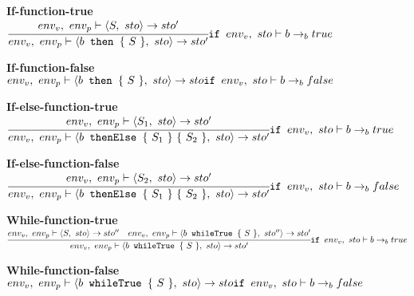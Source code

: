 \textbf{If-function-true}\\
\begin{math}
	\cfrac
		{env_v,\ env_p \vdash \langle S,\ sto \rangle \rightarrow sto'}
		{env_v,\ env_p \vdash \langle b \texttt{ then } \{\ S\ \},\ sto \rangle \rightarrow sto'}\\
	\texttt{if } env_v,\ sto \vdash b \rightarrow_b true
\end{math}

\textbf{If-function-false}\\
\begin{math}
	env_v,\ env_p \vdash \langle b \texttt{ then } \{\ S\ \},\ sto \rangle \rightarrow sto\\
	\texttt{if } env_v,\ sto \vdash b \rightarrow_b false
\end{math}

\textbf{If-else-function-true}\\
\begin{math}
	\cfrac
		{env_v,\ env_p \vdash \langle S_1,\ sto \rangle \rightarrow sto'}
		{env_v,\ env_p \vdash \langle b \texttt{ thenElse } \{\ S_1\ \}\ \{\ S_2\ \},\ sto \rangle \rightarrow sto'}\\
	\texttt{if } env_v,\ sto \vdash b \rightarrow_b true
\end{math}

\textbf{If-else-function-false}\\
\begin{math}
	\cfrac
		{env_v,\ env_p \vdash \langle S_2,\ sto \rangle \rightarrow sto'}
		{env_v,\ env_p \vdash \langle b \texttt{ thenElse } \{\ S_1\ \}\ \{\ S_2\ \},\ sto \rangle \rightarrow sto'}\\
	\texttt{if } env_v,\ sto \vdash b \rightarrow_b false
\end{math}

\textbf{While-function-true}\\
\begin{math}
	\cfrac
		{env_v,\ env_p \vdash \langle S,\ sto \rangle \rightarrow sto'' \quad env_v,\ env_p \vdash \langle  b \texttt{ whileTrue } \{\ S\ \} ,\ sto'' \rangle \rightarrow sto'}
		{env_v,\ env_p \vdash \langle b \texttt{ whileTrue } \{\ S\ \} ,\ sto \rangle \rightarrow sto'}\\
	\texttt{if } env_v,\ sto \vdash b \rightarrow_b true
\end{math}

\textbf{While-function-false}\\
\begin{math}
	env_v,\ env_p \vdash \langle b \texttt{ whileTrue } \{\ S\ \},\ sto \rangle \rightarrow sto\\
	\texttt{if } env_v,\ sto \vdash b \rightarrow_b false
\end{math}

